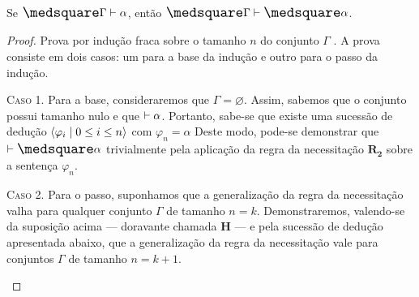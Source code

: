     \begin{theorem}\label{gen-nec}
        Se $\nec\Gamma\entails\alpha$, então $\nec\Gamma\entails\nec\alpha$.

        \begin{proof}
            Prova por indução fraca sobre o tamanho $n$ do conjunto $\Gamma$ \citep{Troelstra}. A prova consiste em dois casos: um para a base da indução e outro para o passo da indução.

            \begin{case}
                \textsc{Caso 1.} Para a base, consideraremos que $\Gamma=\varnothing$.
                Assim, sabemos que o conjunto possui tamanho nulo e que $\mathrel{\vdash}\alpha$. Portanto, sabe-se que existe uma sucessão de dedução $\langle\varphi_i\mid 0\leq i\leq n\rangle$ com $\varphi_n=\alpha$
                Deste modo, pode-se demonstrar que $\entails\nec\alpha$ trivialmente pela aplicação da regra da necessitação \hyperref[necessitation]{$\mathbf{R_2}$} sobre a sentença $\varphi_n$.
            \end{case}

            \begin{case}
                \textsc{Caso 2.} 
                Para o passo, suponhamos que a generalização da regra da necessitação valha para qualquer conjunto $\Gamma$ de tamanho $n=k$.
                Demonstraremos, valendo-se da suposição acima --- doravante chamada $\mathbf{H}$ --- e pela sucessão de dedução apresentada abaixo, que a generalização da regra da necessitação vale para conjuntos $\Gamma$ de tamanho $n=k+1$.


\end{case}
\end{proof}
\end{theorem}
